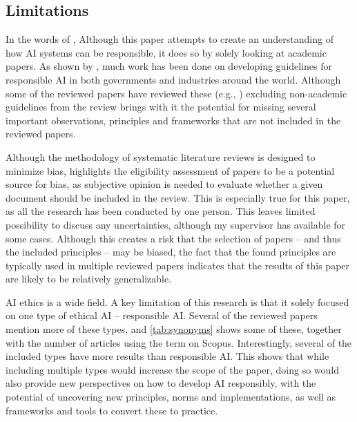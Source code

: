 \subsection{Limitations}
\label{sec:Limitations}
In the words of \textcite[p.~2160]{Morley_2020},  Although this paper attempts to create an understanding of how AI systems can be responsible, it does so by solely looking at academic papers. As shown by \textcite{AlgorithmWatch}, much work has been done on developing guidelines for responsible AI in both governments and industries around the world. Although some of the reviewed papers have reviewed these (e.g., \cite{Bélisle-Pipon_2022,Fjeld_2020,Jobin_2019,Ryan_2021}) excluding non-academic guidelines from the review brings with it the potential for missing several important observations, principles and frameworks that are not included in the reviewed papers.

Although the methodology of systematic literature reviews is designed to minimize bias, \textcite{Tranfield_2003} highlights the eligibility assessment of papers to be a potential source for bias, as subjective opinion is needed to evaluate whether a given document should be included in the review. This is especially true for this paper, as all the research has been conducted by one person. This leaves limited possibility to discuss any uncertainties, although my supervisor has available for some cases. Although this creates a risk that the selection of papers -- and thus the included principles -- may be biased, the fact that the found principles are typically used in multiple reviewed papers indicates that the results of this paper are likely to be relatively generalizable.


AI ethics is a wide field. A key limitation of this research is that it solely focused on one type of ethical AI -- responsible AI. Several of the reviewed papers mention more of these types, and \autoref{tab:synonyms} shows some of these, together with the number of articles using the term on Scopus. Interestingly, several of the included types have more results than responsible AI. This shows that while including multiple types would increase the scope of the paper, doing so would also provide new perspectives on how to develop AI responsibly, with the potential of uncovering new principles, norms and implementations, as well as frameworks and tools to convert these to practice.

